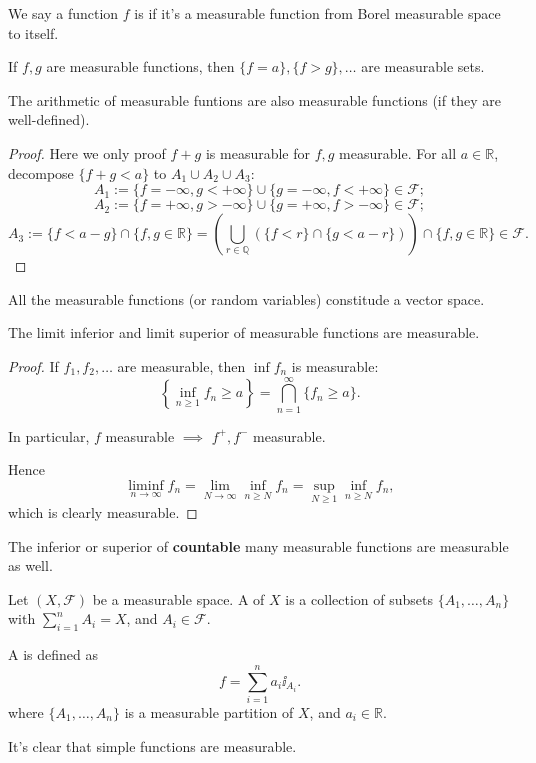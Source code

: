 We say a function $f$ is  if it's a measurable
function from Borel measurable space to itself.

\begin{corollary}
    If $f, g$ are measurable functions, then $ \{f = a\}, \{f>g\}, \dots$
	are measurable sets.
\end{corollary}

\begin{theorem}
    The arithmetic of measurable funtions are also measurable functions
	(if they are well-defined).
\end{theorem}
\begin{proof}[Proof]
    Here we only proof $f+g$ is measurable for  $f,g$ measurable.
	For all  $a\in \mathbb{R}$, decompose $\{f+g<a\}$ to $A_1\cup A_2\cup A_3$:
	\[
	A_1 := \{f = -\infty, g<+\infty\}\cup \{g = -\infty, f<+\infty\}\in \mathscr{F};
	\]
	\[
	A_2 := \{f = +\infty,g>-\infty\}\cup \{g=+\infty,f>-\infty\} \in \mathscr{F};
	\]
	\[
	A_3 := \{f < a - g \}\cap \{f,g\in \mathbb{R}\}
	= \left( \bigcup_{r\in \mathbb{Q}}(\{f<r\}\cap \{g<a-r\}) \right)\cap \{f,g\in \mathbb{R}\}\in \mathscr{F}.
	\]
\end{proof}
\begin{remark}
    All the measurable functions (or random variables) constitude a vector space.
\end{remark}

\begin{theorem}
    The limit inferior and limit superior of measurable functions are measurable.
\end{theorem}
\begin{proof}[Proof]
    If $f_1,f_2,\dots$ are measurable, then $\inf f_n$ is measurable:
	\[
	\left\{\inf_{n\ge 1} f_n \ge a\right\} = \bigcap_{n=1}^\infty\{f_n \ge a\}.
	\]
	\begin{remark}
		In particular, $f$ measurable $\implies$ $f^+, f^-$ measurable.
	\end{remark}

	Hence
	\[
	\liminf_{n\to \infty}f_n = \lim_{N\to \infty}\inf _{n\ge N} f_n
	= \sup_{N\ge 1}\inf_{n\ge N} f_n,
	\]
	which is clearly measurable.
\end{proof}
\begin{remark}
    The inferior or superior of \textbf{countable} many measurable functions
	are measurable as well.
\end{remark}

\begin{definition}
	Let $(X,\mathscr{F})$ be a measurable space. A 
	of $X$ is a collection of subsets $\{A_1,\dots,A_n\}$
	with $\sum_{i=1}^n A_i = X$, and  $A_i\in \mathscr{F}$.

	A  is defined as
	\[
	f = \sum_{i=1}^n a_i \ii_{A_i}.
	\]
	where $\{A_1,\dots,A_n\}$ is a measurable partition of $X$,
	and  $a_i\in \mathbb{R}$.

	It's clear that simple functions are measurable.
\end{definition}

